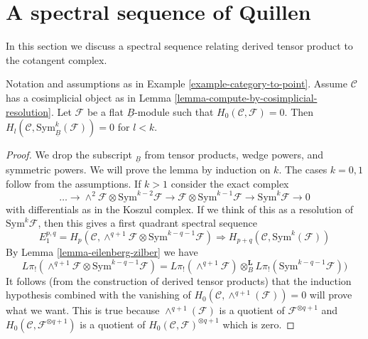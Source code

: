 \section{A spectral sequence of Quillen}
\label{section-spectral-sequence}

\noindent
In this section we discuss a spectral sequence relating derived
tensor product to the cotangent complex.

\begin{lemma}
\label{lemma-vanishing-symmetric-powers}
Notation and assumptions as in Example \ref{example-category-to-point}.
Assume $\mathcal{C}$ has a cosimplicial object as in
Lemma \ref{lemma-compute-by-cosimplicial-resolution}.
Let $\mathcal{F}$ be a flat $\underline{B}$-module such that
$H_0(\mathcal{C}, \mathcal{F}) = 0$.
Then $H_l(\mathcal{C}, \text{Sym}_{\underline{B}}^k(\mathcal{F})) = 0$
for $l < k$.
\end{lemma}

\begin{proof}
We drop the subscript ${}_{\underline{B}}$ from tensor products, wedge powers,
and symmetric powers. We will prove the lemma by induction on $k$.
The cases $k = 0, 1$ follow from the assumptions. If $k > 1$ consider
the exact complex
$$
\ldots \to
\wedge^2\mathcal{F} \otimes \text{Sym}^{k - 2}\mathcal{F} \to
\mathcal{F} \otimes \text{Sym}^{k - 1}\mathcal{F} \to
\text{Sym}^k\mathcal{F} \to 0
$$
with differentials as in the Koszul complex. If we think of this as a
resolution of $\text{Sym}^k\mathcal{F}$, then this gives a first quadrant
spectral sequence
$$
E_1^{p, q} =
H_p(\mathcal{C},
\wedge^{q + 1}\mathcal{F} \otimes \text{Sym}^{k - q - 1}\mathcal{F})
\Rightarrow
H_{p + q}(\mathcal{C}, \text{Sym}^k(\mathcal{F}))
$$
By Lemma \ref{lemma-eilenberg-zilber} we have
$$
L\pi_!(\wedge^{q + 1}\mathcal{F} \otimes \text{Sym}^{k - q - 1}\mathcal{F}) =
L\pi_!(\wedge^{q + 1}\mathcal{F}) \otimes_B^\mathbf{L}
L\pi_!(\text{Sym}^{k - q - 1}\mathcal{F}))
$$
It follows (from the construction of derived tensor products) that
the induction hypothesis combined with the vanishing
of $H_0(\mathcal{C}, \wedge^{q + 1}(\mathcal{F})) = 0$ will prove what we want.
This is true because $\wedge^{q + 1}(\mathcal{F})$ is a quotient
of $\mathcal{F}^{\otimes q + 1}$ and
$H_0(\mathcal{C}, \mathcal{F}^{\otimes q + 1})$
is a quotient of $H_0(\mathcal{C}, \mathcal{F})^{\otimes q + 1}$
which is zero.
\end{proof}

